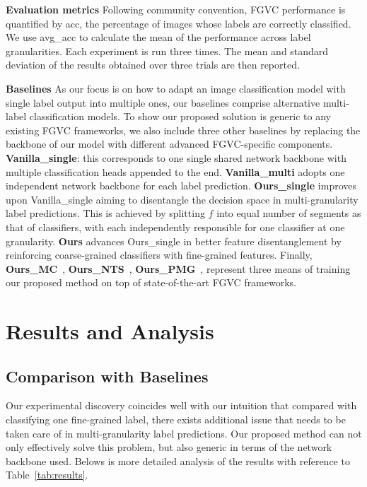 \documentclass[final]{cvpr}
\newcommand{\keypoint}[1]{\vspace{0.05cm}\noindent\textbf{#1}\quad}
\begin{document}
\keypoint{Evaluation metrics} Following community convention, FGVC performance is quantified by acc, the percentage of images whose labels are correctly classified. We use avg\_acc to calculate the mean of the performance across label granularities. Each experiment is run three times. The mean and standard deviation of the results obtained over three trials are then reported.

\keypoint{Baselines} As our focus is on how to adapt an image classification model with single label output into multiple ones, our baselines comprise alternative multi-label classification models. To show our proposed solution is generic to any existing FGVC frameworks, we also include three other baselines by replacing the backbone of our model with different advanced FGVC-specific components. \textbf{Vanilla\_single}: this corresponds to one single shared network backbone with multiple classification heads appended to the end. \textbf{Vanilla\_multi} adopts one independent network backbone for each label prediction. \textbf{Ours\_single} improves upon Vanilla\_single aiming to disentangle the decision space in multi-granularity label predictions. This is achieved by splitting $f$ into equal number of segments as that of classifiers, with each independently responsible for one classifier at one granularity. \textbf{Ours} advances Ours\_single in better feature disentanglement by reinforcing coarse-grained classifiers with fine-grained features. Finally, \textbf{Ours\_MC}~\cite{chang2020mc}, \textbf{Ours\_NTS}~\cite{yang2018learning}, \textbf{Ours\_PMG}~\cite{du2020fine}, represent three means of training our proposed method on top of state-of-the-art FGVC frameworks. 


\section{Results and Analysis}

\subsection{Comparison with Baselines}

Our experimental discovery coincides well with our intuition that compared with classifying one fine-grained label, there exists additional issue that needs to be taken care of in multi-granularity label predictions. Our proposed method can not only effectively solve this problem, but also generic in terms of the network backbone used. Belows is more detailed analysis of the results with reference to Table~\ref{tab:results}.
\end{document}
